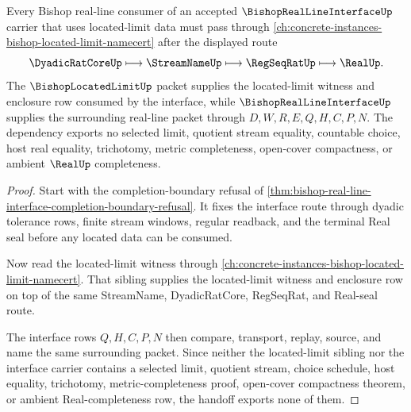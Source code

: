 \begin{theorem}
\label{thm:bishop-real-line-interface-located-limit-dependency}
Every Bishop real-line consumer of an accepted $\BishopRealLineInterfaceUp$ carrier that uses located-limit data must pass through \autoref{ch:concrete-instances-bishop-located-limit-namecert} after the displayed route
$$
\DyadicRatCoreUp \longmapsto \StreamNameUp \longmapsto \RegSeqRatUp \longmapsto \RealUp .
$$
The $\BishopLocatedLimitUp$ packet supplies the located-limit witness and enclosure row consumed by the interface, while $\BishopRealLineInterfaceUp$ supplies the surrounding real-line packet through $D,W,R,E,Q,H,C,P,N$. The dependency exports no selected limit, quotient stream equality, countable choice, host real equality, trichotomy, metric completeness, open-cover compactness, or ambient $\RealUp$ completeness.
\end{theorem}
\begin{proof}
Start with the completion-boundary refusal of \autoref{thm:bishop-real-line-interface-completion-boundary-refusal}. It fixes the interface route through dyadic tolerance rows, finite stream windows, regular readback, and the terminal Real seal before any located data can be consumed.

Now read the located-limit witness through \autoref{ch:concrete-instances-bishop-located-limit-namecert}. That sibling supplies the located-limit witness and enclosure row on top of the same StreamName, DyadicRatCore, RegSeqRat, and Real-seal route.

The interface rows $Q,H,C,P,N$ then compare, transport, replay, source, and name the same surrounding packet. Since neither the located-limit sibling nor the interface carrier contains a selected limit, quotient stream, choice schedule, host equality, trichotomy, metric-completeness proof, open-cover compactness theorem, or ambient Real-completeness row, the handoff exports none of them.
\end{proof}


